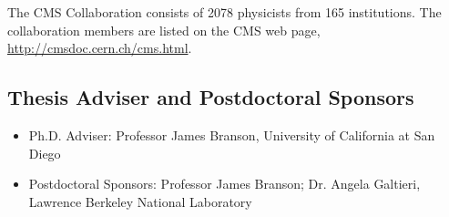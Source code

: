 \documentclass[11pt]{article}
\begin{document}
\noindent The CMS Collaboration consists of 2078 physicists from 165
  institutions. The collaboration members are listed on the CMS web page,
\href{http://cmsdoc.cern.ch/cms.html}{http://cmsdoc.cern.ch/cms.html}.

\subsection*{Thesis Adviser and Postdoctoral Sponsors}
\begin{itemize}
\item Ph.D. Adviser: Professor James Branson, University of California
  at San Diego
\item Postdoctoral Sponsors: Professor James Branson; Dr. Angela
  Galtieri, Lawrence Berkeley National Laboratory
\end{itemize}
\end{document}
